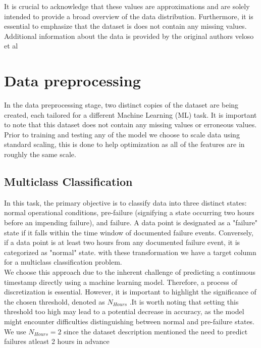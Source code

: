 \documentclass{article}
\begin{document}
It is crucial to acknowledge that these values are approximations and are solely intended to provide a broad overview of the data distribution. Furthermore, it is essential to emphasize that the dataset is does not contain any missing values. Additional information about the data is provided by the original authors veloso et al\cite{Veloso2022}

\newpage

\section{Data preprocessing}

In the data preprocessing stage, two distinct copies of the dataset are being created, each tailored for a different Machine Learning (ML) task. It is important to note that this dataset does not contain any missing values or erroneous values. \\

Prior to training and testing any of the model we choose to scale data using standard scaling, this is done to help optimization as all of the features are in roughly the same scale.

\subsection{Multiclass Classification} 

In this task, the primary objective is to classify data into three distinct states: normal operational conditions, pre-failure (signifying a state occurring two hours before an impending failure), and failure. A data point is designated as a "failure" state if it falls within the time window of documented failure events. Conversely, if a data point is at least two hours from any documented failure event, it is categorized as "normal" state. with these transformation we have a target column for a multiclass classification problem.\\ 

We choose this approach due to the inherent challenge of predicting a continuous timestamp directly using a machine learning model. Therefore, a process of discretization is essential. However, it is important to highlight the significance of the chosen threshold, denoted as $N_{Hours}$ .It is worth noting that setting this threshold too high may lead to a potential decrease in accuracy, as the model might encounter difficulties distinguishing between normal and pre-failure states. We use $N_{Hours} = 2$ since the dataset description mentioned the need to predict failures atleast 2 hours in advance \\
\end{document}
